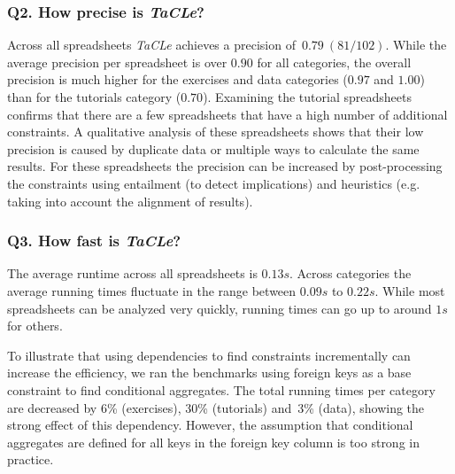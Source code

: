 \documentclass{IEEEtran}
\newcommand{\format}[1]{\textit{#1}\xspace}
\newcommand{\sname}{\format{TaCLe}}
\theoremstyle{definition}
\begin{document}
\subsubsection*{Q2. How precise is \sname?}
Across all spreadsheets \sname achieves a precision of~$0.79~(81/102)$.
While the average precision per spreadsheet is over $0.90$ for all categories, the overall precision is much higher for the exercises and data categories ($0.97$ and $1.00$) than for the tutorials category ($0.70$).
Examining the tutorial spreadsheets confirms that there are a few spreadsheets that have a high number of additional constraints.
A qualitative analysis of these spreadsheets shows that their low precision is caused by duplicate data or multiple ways to calculate the same results.
For these spreadsheets the precision can be increased by post-processing the constraints using entailment (to detect implications) and heuristics (e.g. taking into account the alignment of results).





\subsubsection*{Q3. How fast is \sname?}
The average runtime across all spreadsheets is $0.13s$.
Across categories the average running times fluctuate in the range between $0.09s$ to $0.22s$.
While most spreadsheets can be analyzed very quickly, running times can go up to around $1s$ for others.





To illustrate that using dependencies to find constraints incrementally can increase the efficiency, we ran the benchmarks using foreign keys as a base constraint to find conditional aggregates.
The total running times per category are decreased by 6\% (exercises), 30\% (tutorials) and~3\% (data), showing the strong effect of this dependency.
However, the assumption that conditional aggregates are defined for all keys in the foreign key column is too strong in practice.
\end{document}

